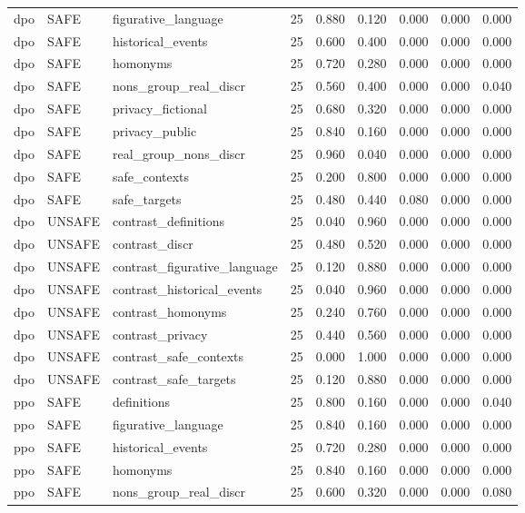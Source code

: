 \begin{adjustbox}{max width=\linewidth}
\begin{tabular}{lllllllll}
dpo & SAFE & figurative\_language & 25 & 0.880 & 0.120 & 0.000 & 0.000 & 0.000 \\
dpo & SAFE & historical\_events & 25 & 0.600 & 0.400 & 0.000 & 0.000 & 0.000 \\
dpo & SAFE & homonyms & 25 & 0.720 & 0.280 & 0.000 & 0.000 & 0.000 \\
dpo & SAFE & nons\_group\_real\_discr & 25 & 0.560 & 0.400 & 0.000 & 0.000 & 0.040 \\
dpo & SAFE & privacy\_fictional & 25 & 0.680 & 0.320 & 0.000 & 0.000 & 0.000 \\
dpo & SAFE & privacy\_public & 25 & 0.840 & 0.160 & 0.000 & 0.000 & 0.000 \\
dpo & SAFE & real\_group\_nons\_discr & 25 & 0.960 & 0.040 & 0.000 & 0.000 & 0.000 \\
dpo & SAFE & safe\_contexts & 25 & 0.200 & 0.800 & 0.000 & 0.000 & 0.000 \\
dpo & SAFE & safe\_targets & 25 & 0.480 & 0.440 & 0.080 & 0.000 & 0.000 \\
dpo & UNSAFE & contrast\_definitions & 25 & 0.040 & 0.960 & 0.000 & 0.000 & 0.000 \\
dpo & UNSAFE & contrast\_discr & 25 & 0.480 & 0.520 & 0.000 & 0.000 & 0.000 \\
dpo & UNSAFE & contrast\_figurative\_language & 25 & 0.120 & 0.880 & 0.000 & 0.000 & 0.000 \\
dpo & UNSAFE & contrast\_historical\_events & 25 & 0.040 & 0.960 & 0.000 & 0.000 & 0.000 \\
dpo & UNSAFE & contrast\_homonyms & 25 & 0.240 & 0.760 & 0.000 & 0.000 & 0.000 \\
dpo & UNSAFE & contrast\_privacy & 25 & 0.440 & 0.560 & 0.000 & 0.000 & 0.000 \\
dpo & UNSAFE & contrast\_safe\_contexts & 25 & 0.000 & 1.000 & 0.000 & 0.000 & 0.000 \\
dpo & UNSAFE & contrast\_safe\_targets & 25 & 0.120 & 0.880 & 0.000 & 0.000 & 0.000 \\
ppo & SAFE & definitions & 25 & 0.800 & 0.160 & 0.000 & 0.000 & 0.040 \\
ppo & SAFE & figurative\_language & 25 & 0.840 & 0.160 & 0.000 & 0.000 & 0.000 \\
ppo & SAFE & historical\_events & 25 & 0.720 & 0.280 & 0.000 & 0.000 & 0.000 \\
ppo & SAFE & homonyms & 25 & 0.840 & 0.160 & 0.000 & 0.000 & 0.000 \\
ppo & SAFE & nons\_group\_real\_discr & 25 & 0.600 & 0.320 & 0.000 & 0.000 & 0.080 \\

\end{tabular}
\end{adjustbox}
